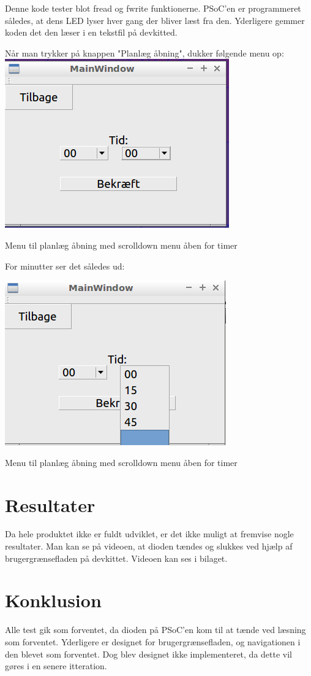 Denne kode tester blot fread og fwrite funktionerne. PSoC'en er programmeret således, at dens LED lyser hver gang der bliver læst fra den. Yderligere gemmer koden det den læser i en tekstfil på devkitted.

Når man trykker på knappen "Planlæg åbning", dukker følgende menu op:
\includegraphics{Billeder/paMin}
\caption{Menu til planlæg åbning med scrolldown menu åben for timer}

For minutter ser det således ud:

\includegraphics{Billeder/paMinutter}
\caption{Menu til planlæg åbning med scrolldown menu åben for timer}

\section*{Resultater}

Da hele produktet ikke er fuldt udviklet, er det ikke muligt at fremvise nogle resultater. Man kan se på videoen, at dioden tændes og slukkes ved hjælp af brugergrænsefladen på devkittet. Videoen kan ses i bilaget.

\section*{Konklusion}

Alle test gik som forventet, da dioden på PSoC'en kom til at tænde ved læsning som forventet. Yderligere er designet for brugergrænsefladen, og navigationen i den blevet som forventet. Dog blev designet ikke implementeret, da dette vil gøres i en senere itteration.